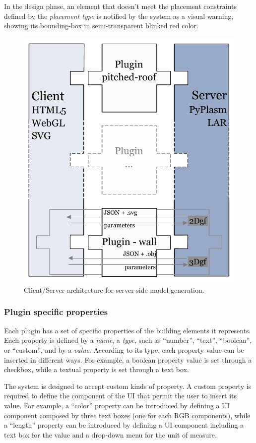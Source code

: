 In the design phase, an element that doesn't meet the placement constraints defined by the \emph{placement type} is notified by the system as a visual warning, showing its bounding-box in semi-transparent blinked red color.

\begin{figure}[htbp] %
   \centering

   \includegraphics[width=0.6\linewidth]{images/architecture-h}

   \caption{Client/Server architecture for server-side model generation.}
   \label{fig:c-s-arch}
\end{figure}

\subsubsection{Plugin specific properties}

\noindent Each plugin has a set of specific properties of the building elements it represents.
Each property is defined by a  \emph{name}, a \emph{type}, such as ``number'', ``text'', ``boolean'', or ``custom'', and by a \emph{value}.
According to its type, each property value can be inserted in different ways.
For example, a boolean property value is set through a checkbox, while a textual property is set through a text box.

The system is designed to accept custom kinds of property. A custom property is required to define the component of the UI that permit the user to insert its value.
For example, a ``color'' property can be introduced by defining a UI component composed by three text boxes (one for each RGB components), while a ``length'' property can be introduced by defining a UI component including a text box for the value and a drop-down menu for the unit of measure.

